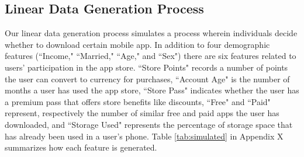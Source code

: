 \documentclass[mnsc,blindrev]{informs3}
\begin{document}
 \subsection{Linear Data Generation Process}
 \label{sec:data_generation}
 Our linear data generation process simulates a process wherein individuals decide whether to download certain mobile app. In addition to four demographic features (``Income," ``Married," ``Age," and ``Sex") there are six features related to users' participation in the app store. ``Store Points" records a number of points the user can convert to currency for purchases, ``Account Age" is the number of months a user has used the app store, ``Store Pass" indicates whether the user has a premium pass that offers store benefits like discounts, ``Free" and ``Paid" represent, respectively the number of similar free and paid apps the user has downloaded, and ``Storage Used" represents the percentage of storage space that has already been used in a user's phone. Table \ref{tab:simulated} in Appendix X summarizes how each feature is generated. 
\end{document}
